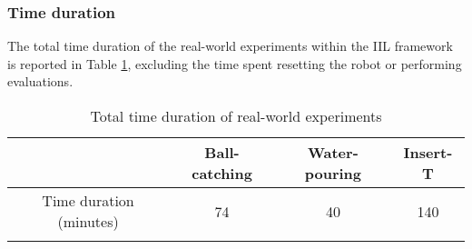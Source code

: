 \subsubsection{Time duration}
\label{appendix:time_duration}
The total time duration of the real-world experiments within the IIL framework is reported in Table \ref{tab:appendix:Time_duration_real_world}, excluding the time spent resetting the robot or performing evaluations.


\begin{table}[h]
\caption{Total time duration of real-world experiments}
\label{tab:appendix:Time_duration_real_world}
\begin{center}
\begin{tabular}{cccc}
\Xhline{0.75pt}
                    & Ball-catching & Water-pouring & Insert-T \\ \hline
Time duration (minutes) & 74        & 40            & 140            \\
\Xhline{0.75pt}
\end{tabular}
\end{center}
\end{table}


